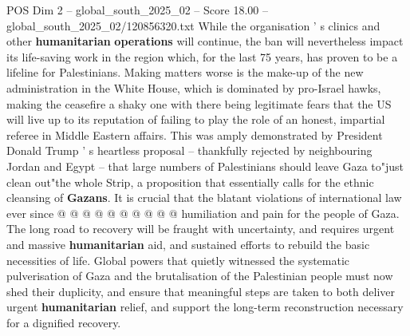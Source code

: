 \begin{textsample}{POS Dim 2 – global\_south\_2025\_02 – Score 18.00 – global\_south\_2025\_02/120856320.txt}
While the organisation ' s clinics and other \textbf{humanitarian} \textbf{operations} will continue, the ban will nevertheless impact its life-saving work in the region which, for the last 75 years, has proven to be a lifeline for Palestinians.
Making matters worse is the make-up of the new administration in the White House, which is dominated by pro-Israel hawks, making the ceasefire a shaky one with there being legitimate fears that the US will live up to its reputation of failing to play the role of an honest, impartial referee in Middle Eastern affairs.
This was amply demonstrated by President Donald Trump ' s heartless proposal -- thankfully rejected by neighbouring Jordan and Egypt -- that large numbers of Palestinians should leave Gaza to"just clean out"the whole Strip, a proposition that essentially calls for the ethnic cleansing of \textbf{Gazans}.
It is crucial that the blatant violations of international law ever since @ @ @ @ @ @ @ @ @ @ humiliation and pain for the people of Gaza.
The long road to recovery will be fraught with uncertainty, and requires urgent and massive \textbf{humanitarian} aid, and sustained efforts to rebuild the basic necessities of life.
Global powers that quietly witnessed the systematic pulverisation of Gaza and the brutalisation of the Palestinian people must now shed their duplicity, and ensure that meaningful steps are taken to both deliver urgent \textbf{humanitarian} relief, and support the long-term reconstruction necessary for a dignified recovery.

\end{textsample}
